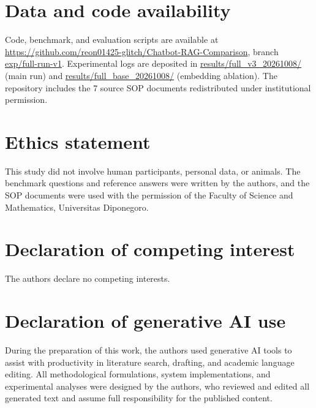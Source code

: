 \documentclass[a4paper,fleqn]{cas-sc}
\begin{document}
\section*{Data and code availability}
Code, benchmark, and evaluation scripts are available at \url{https://github.com/reon01425-glitch/Chatbot-RAG-Comparison}, branch \url{exp/full-run-v1}. Experimental logs are deposited in \url{results/full_v3_20261008/} (main run) and \url{results/full_base_20261008/} (embedding ablation). The repository includes the 7 source SOP documents redistributed under institutional permission.

\printcredits

\section*{Ethics statement}
This study did not involve human participants, personal data, or animals. The benchmark questions and reference answers were written by the authors, and the SOP documents were used with the permission of the Faculty of Science and Mathematics, Universitas Diponegoro.

\section*{Declaration of competing interest}
The authors declare no competing interests.

\section*{Declaration of generative AI use}
During the preparation of this work, the authors used generative AI tools to assist with productivity in literature search, drafting, and academic language editing. All methodological formulations, system implementations, and experimental analyses were designed by the authors, who reviewed and edited all generated text and assume full responsibility for the published content.
\end{document}

